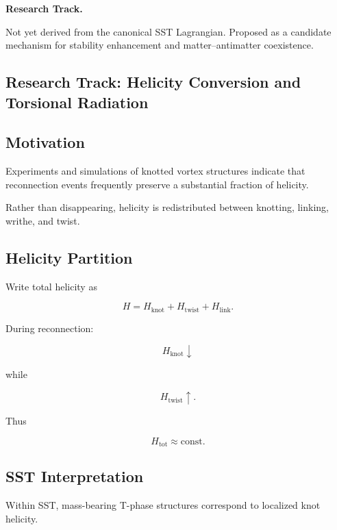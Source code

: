         \textbf{Research Track.}
        
        Not yet derived from the canonical SST Lagrangian.
        Proposed as a candidate mechanism for stability enhancement and
        matter--antimatter coexistence.
    
    
\subsection{Research Track: Helicity Conversion and Torsional Radiation}
    
    \subsection{Motivation}
        
        Experiments and simulations of knotted vortex structures indicate that
        reconnection events frequently preserve a substantial fraction of helicity.
        
        Rather than disappearing, helicity is redistributed between knotting,
        linking, writhe, and twist.
    
    \subsection{Helicity Partition}
        
        Write total helicity as
        
        \[
            H
            =
            H_{\mathrm{knot}}
            +
            H_{\mathrm{twist}}
            +
            H_{\mathrm{link}}.
        \]
        
        During reconnection:
        
        \[
            H_{\mathrm{knot}}
            \downarrow
        \]
        
        while
        
        \[
            H_{\mathrm{twist}}
            \uparrow .
        \]
        
        Thus
        
        \[
            H_{\mathrm{tot}}
            \approx
            \mathrm{const}.
        \]
    
    \subsection{SST Interpretation}
        
        Within SST, mass-bearing T-phase structures correspond to localized knot
        helicity.
        
